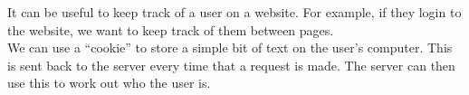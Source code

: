 It can be useful to keep track of a user on a website. For example, if they login to the website, we want to keep track of them between pages.
\\

We can use a ``cookie'' to store a simple bit of text on the user's computer. This is sent back to the server every time that a request is made. The server can then use this to work out who the user is.
